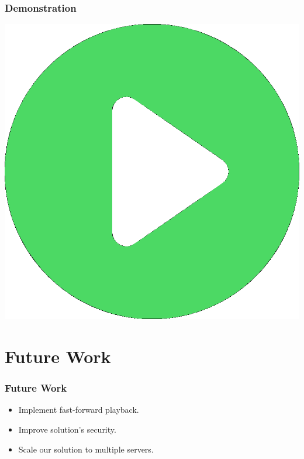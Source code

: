 \documentclass[compress]{beamer}
\begin{document}
  		\begin{frame}[c]
		\frametitle{Demonstration}
	
		\begin{center}
		\href{run:video.mp4}{
		\includegraphics[scale=0.25]
		{video.eps}}
		\end{center}


		\end{frame}

\section{Future Work}\label{concl} %

\begin{frame}[c]
		\frametitle{Future Work}
		\begin{itemize}
\item Implement fast-forward playback.
		\vfill

\item Improve solution's security.
		\vfill

\item Scale our solution to multiple servers.
		\end{itemize}

	\end{frame}
\end{document}
